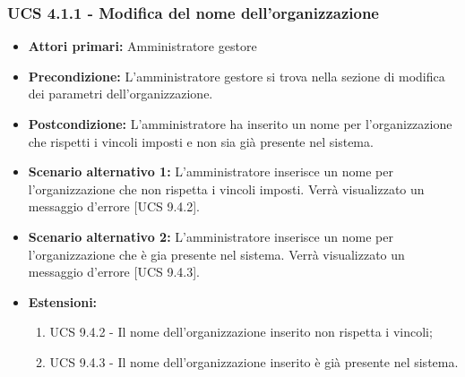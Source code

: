 \subsubsection{UCS 4.1.1 - Modifica del nome dell'organizzazione}%
\begin{itemize}
\item \textbf{Attori primari:} Amministratore gestore
\item \textbf{Precondizione:} L'amministratore gestore si trova nella sezione di modifica dei parametri dell'organizzazione.
\item \textbf{Postcondizione:} L'amministratore ha inserito un nome per l'organizzazione che rispetti i vincoli imposti e non sia già presente nel sistema.
\item \textbf{Scenario alternativo 1:} L'amministratore inserisce un nome per l'organizzazione che non rispetta i vincoli imposti. Verrà visualizzato un messaggio d'errore [UCS 9.4.2].
\item \textbf{Scenario alternativo 2:} L'amministratore inserisce un nome per l'organizzazione che è gia presente nel sistema. Verrà visualizzato un messaggio d'errore [UCS 9.4.3].
\item \textbf{Estensioni:}
\begin{enumerate}
    \item UCS 9.4.2 - Il nome dell'organizzazione inserito non rispetta i vincoli;
    \item UCS 9.4.3 - Il nome dell'organizzazione inserito è già presente nel sistema.
\end{enumerate}
\end{itemize}


